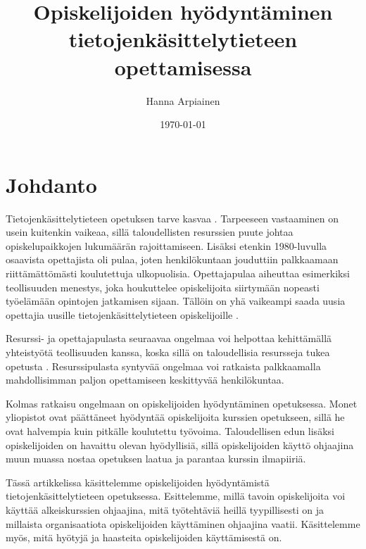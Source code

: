 \documentclass[finnish]{tktltiki2}
\title{﻿Opiskelijoiden hyödyntäminen tietojenkäsittelytieteen opettamisessa}
\author{Hanna Arpiainen}
\date{\today}
\theoremstyle{definition}
\theoremstyle{remark}
\begin{document}
\frontmatter
\maketitle
\makeabstract
\thispagestyle{empty}
\tableofcontents
\thispagestyle{empty}
\newpage

\mainmatter

\setcounter{page}{1}



\section{Johdanto}
Tietojenkäsittelytieteen opetuksen tarve kasvaa \cite{Roberts11}. Tarpeeseen vastaaminen on usein kuitenkin vaikeaa, sillä taloudellisten resurssien puute johtaa opiskelupaikkojen lukumäärän rajoittamiseen. Lisäksi etenkin 1980-luvulla osaavista opettajista oli pulaa, joten henkilökuntaan jouduttiin palkkaamaan riittämättömästi koulutettuja ulkopuolisia. Opettajapulaa aiheuttaa esimerkiksi teollisuuden menestys, joka houkuttelee opiskelijoita siirtymään nopeasti työelämään opintojen jatkamisen sijaan. Tällöin on yhä vaikeampi saada uusia opettajia uusille tietojenkäsittelytieteen opiskelijoille \cite{Roberts99}. \par

Resurssi- ja opettajapulasta seuraavaa ongelmaa voi helpottaa kehittämällä yhteistyötä teollisuuden kanssa, koska sillä on taloudellisia resursseja tukea opetusta \cite{Roberts11}. Resurssipulasta syntyvää ongelmaa voi ratkaista palkkaamalla mahdollisimman paljon opettamiseen keskittyvää henkilökuntaa. \par

Kolmas ratkaisu ongelmaan on opiskelijoiden hyödyntäminen opetuksessa. Monet yliopistot ovat päättäneet hyödyntää opiskelijoita kurssien opetukseen, sillä he ovat halvempia kuin pitkälle koulutettu työvoima. Taloudellisen edun lisäksi opiskelijoiden on havaittu olevan hyödyllisiä, sillä opiskelijoiden käyttö ohjaajina muun muassa nostaa opetuksen laatua ja parantaa kurssin ilmapiiriä. \par

Tässä artikkelissa käsittelemme opiskelijoiden hyödyntämistä tie\-to\-jen\-kä\-sit\-te\-ly\-tie\-teen opetuksessa. Esittelemme, millä tavoin opiskelijoita voi käyttää alkeiskurssien ohjaajina, mitä työtehtäviä heillä tyypillisesti on ja millaista organisaatiota opiskelijoiden käyttäminen ohjaajina vaatii. Käsittelemme myös, mitä hyötyjä ja haasteita opiskelijoiden käyttämisestä on. \par
\end{document}
